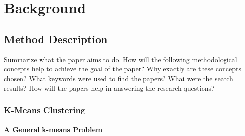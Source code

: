 \chapter{Background}
\label{cha:background}

\section{Method Description}
\label{sec:method_description}
Summarize what the paper aims to do.
How will the following methodological concepts help to achieve the goal of the paper?
Why exactly are these concepts chosen?
What keywords were used to find the papers?
What were the search results?
How will the papers help in answering the research questions?




%

\subsection{K-Means Clustering}
\label{subsec:k_means_clustering}
\subsubsection*{A General k-means Problem}
